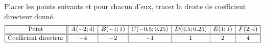 
\begin{exercice}\label{exosmath-0300}

    Placer les points suivants et pour chacun d'eux, tracer la droite de coefficient directeur donné.
    \begin{equation*}
        \begin{array}[]{|c||c|c|c|c|c|c|}
            \hline
            \text{Point}&A(-2;4)&B(-1;1)&C(-0.5;0.25)&D(0.5;0.25)&E(1;1)&F(2;4)\\
            \hline\hline
            \text{Coefficient directeur}&-4&-2&-1&1&2&4\\
            \hline
        \end{array}
    \end{equation*}

\end{exercice}
